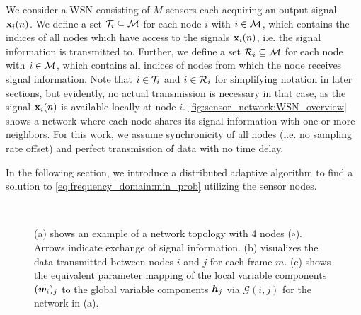 \documentclass{article}
\begin{document}
We consider a WSN consisting of \(M\) sensors each acquiring an output signal \(\bm{\mathrm{x}}_i(n)\).
We define a set \(\mathcal{T}_i \subseteq \mathcal{M}\) for each node \(i\) with \(i \in \mathcal{M}\), which contains the indices of all nodes which have access to the signals \(\bm{\mathrm{x}}_i(n)\), i.e. the signal information is transmitted to.
Further, we define a set \(\mathcal{R}_i \subseteq \mathcal{M}\) for each node with \(i \in \mathcal{M}\), which contains all indices of nodes from which the node receives signal information.
Note that \(i \in \mathcal{T}_i\) and \(i \in \mathcal{R}_i\) for simplifying notation in later sections, but evidently, no actual transmission is necessary in that case, as the signal \(\bm{\mathrm{x}}_i(n)\) is available locally at node \(i\).
\autoref{fig:sensor_network:WSN_overview} shows a network where each node shares its signal information with one or more neighbors.
For this work, we assume synchronicity of all nodes (i.e. no sampling rate offset) and perfect transmission of data with no time delay.

In the following section, we introduce a distributed adaptive algorithm to find a solution to \eqref{eq:frequency_domain:min_prob} utilizing the sensor nodes.

\begin{figure}
    \centering
    \subfloat[][]{\label{fig:sensor_network:WSN_overview}}\hspace*{0.05\columnwidth}
    \subfloat[][]{\label{fig:sensor_network:WSN_detail}}\\
    \vspace*{-0.2cm}
    \vspace*{-0.1cm}
    \caption{(a) shows an example of a network topology with 4 nodes (\(\circ\)). Arrows indicate exchange of signal information. (b) visualizes the data transmitted between nodes \(i\) and \(j\) for each frame \(m\). (c) shows the equivalent parameter mapping of the local variable components \(({{\bm{w}}}_i)_j\) to the global variable components \({\bm{h}}_j\) via \(\mathcal{G}(i,j)\) for the network in (a).}
    \label{fig:sensor_network:WSN_mapping}
\end{figure}
\end{document}
